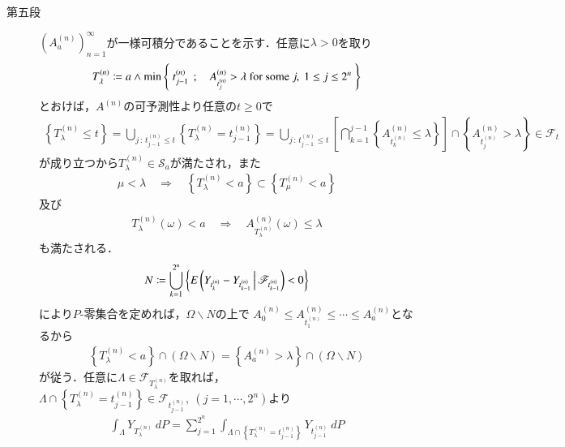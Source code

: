 \begin{prf}
\begin{description}
			\item[第五段]
				$\left( A^{(n)}_a \right)_{n=1}^\infty$が一様可積分であることを示す．任意に$\lambda > 0$を取り
				\begin{align}
					T_\lambda^{(n)} \coloneqq
					a \wedge \operatorname*{min}_{} \left\{\ t^{(n)}_{j-1}\ \, ; \quad A^{(n)}_{t^{(n)}_j} > \lambda \mbox{ for some } j,\ 1 \leq j \leq 2^n\ \right\}
				\end{align}
				とおけば，$A^{(n)}$の可予測性より任意の$t \geq 0$で
				\begin{align}
					\left\{ T_\lambda^{(n)} \leq t \right\}
					= \bigcup_{j\, :\, t^{(n)}_{j-1} \leq t} \left\{ T_\lambda^{(n)} = t^{(n)}_{j-1} \right\}
					= \bigcup_{j\, :\, t^{(n)}_{j-1} \leq t}
						\left[ \bigcap_{k=1}^{j-1} \left\{ A^{(n)}_{t^{(n)}_k} \leq \lambda \right\} \right] 
						\cap \left\{ A^{(n)}_{t^{(n)}_j} > \lambda \right\}
					\in \mathscr{F}_t
				\end{align}
				が成り立つから$T_\lambda^{(n)} \in \mathscr{S}_a$が満たされ，また
				\begin{align}
					\mu < \lambda
					\quad \Longrightarrow \quad
					\left\{T^{(n)}_\lambda < a\right\} \subset \left\{T^{(n)}_\mu < a\right\}
					\label{eq:chapter_1_theorem_4_10_6}
				\end{align}
				及び
				\begin{align}
					T^{(n)}_\lambda(\omega) < a
					\quad \Longrightarrow \quad
					A^{(n)}_{T^{(n)}_\lambda}(\omega) \leq \lambda
					\label{eq:chapter_1_theorem_4_10_3}
				\end{align}
				も満たされる．
				\begin{align}
					N \coloneqq \bigcup_{k=1}^{2^n} \left\{ E\left( Y_{t^{(n)}_k} - Y_{t^{(n)}_{k-1}} \, \middle|\, \mathscr{F}_{t^{(n)}_{k-1}} \right) < 0 \right\}
				\end{align}
				により$P$-零集合を定めれば，$\Omega \backslash N$の上で
				$A^{(n)}_0 \leq A^{(n)}_{t^{(n)}_1} \leq \cdots \leq A^{(n)}_a$となるから
				\begin{align}
					\left\{T^{(n)}_\lambda < a\right\} \cap (\Omega \backslash N)
					= \left\{A^{(n)}_a > \lambda\right\} \cap (\Omega \backslash N)
					\label{eq:chapter_1_theorem_4_10_1}
				\end{align}
				が従う．任意に$\Lambda \in \mathscr{F}_{T^{(n)}_\lambda}$を取れば，
				$\Lambda \cap \left\{T^{(n)}_\lambda=t^{(n)}_{j-1}\right\} \in \mathscr{F}_{t^{(n)}_{j-1}},
				\ (j=1,\cdots,2^n)$より
				\begin{align}
					\int_\Lambda Y_{T^{(n)}_\lambda}\ dP = 
					\sum_{j=1}^{2^n} \int_{\Lambda \cap \left\{T^{(n)}_\lambda=t^{(n)}_{j-1}\right\}} Y_{t^{(n)}_{j-1}}\ dP

\end{align}
\end{description}
\end{prf}
